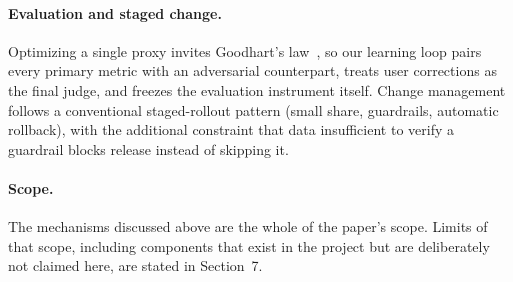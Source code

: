 \paragraph{Evaluation and staged change.} Optimizing a single proxy invites
Goodhart's law~\cite{goodhart1975}, so our learning loop pairs every primary
metric with an adversarial counterpart, treats user corrections as the final
judge, and freezes the evaluation instrument itself. Change management follows
a conventional staged-rollout pattern (small share, guardrails, automatic
rollback), with the additional constraint that data insufficient to verify a
guardrail blocks release instead of skipping it.

\paragraph{Scope.} The mechanisms discussed above are the whole of the paper's
scope. Limits of that scope, including components that exist in the project but
are deliberately not claimed here, are stated in Section~7.
